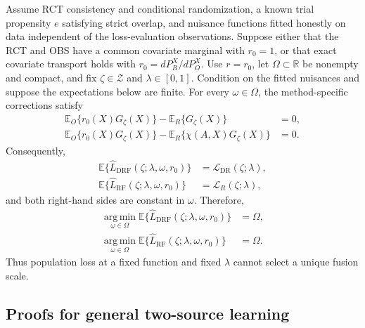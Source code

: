 \begin{proposition}
\label{prop:cate-omega-flatness}
Assume RCT consistency and conditional randomization, a known trial
propensity $e$ satisfying strict overlap, and nuisance functions fitted
honestly on data independent of the loss-evaluation observations.  Suppose
either that the RCT and OBS have a common covariate marginal with $r_0=1$,
or that exact covariate transport holds with
$r_0=dP_R^X/dP_O^X$.  Use $r=r_0$, let
$\Omega\subset\mathbb R$ be nonempty and compact, and fix
$\zeta\in\mathcal Z$ and $\lambda\in[0,1]$.  Condition on the fitted
nuisances and suppose the expectations below are finite.  For every
$\omega\in\Omega$, the method-specific corrections satisfy
\begin{align*}
\mathbb E_O\{r_0(X)G_\zeta(X)\}-\mathbb E_R\{G_\zeta(X)\}
&=0,\\
\mathbb E_O\{r_0(X)G_\zeta(X)\}
-\mathbb E_R\{\chi(A,X)G_\zeta(X)\}
&=0.
\end{align*}
Consequently,
\begin{align*}
\mathbb E\{\widehat L_{\mathrm{DRF}}
(\zeta;\lambda,\omega,r_0)\}
&=\mathcal L_{\mathrm{DR}}(\zeta;\lambda),\\
\mathbb E\{\widehat L_{\mathrm{RF}}
(\zeta;\lambda,\omega,r_0)\}
&=\mathcal L_R(\zeta;\lambda),
\end{align*}
and both right-hand sides are constant in $\omega$.  Therefore,
\begin{align*}
\operatorname*{arg\,min}_{\omega\in\Omega}
\mathbb E\{\widehat L_{\mathrm{DRF}}
(\zeta;\lambda,\omega,r_0)\}
&=\Omega,\\
\operatorname*{arg\,min}_{\omega\in\Omega}
\mathbb E\{\widehat L_{\mathrm{RF}}
(\zeta;\lambda,\omega,r_0)\}
&=\Omega.
\end{align*}
Thus population loss at a fixed function and fixed $\lambda$ cannot select
a unique fusion scale.
\end{proposition}

\subsection{Proofs for general two-source learning}

